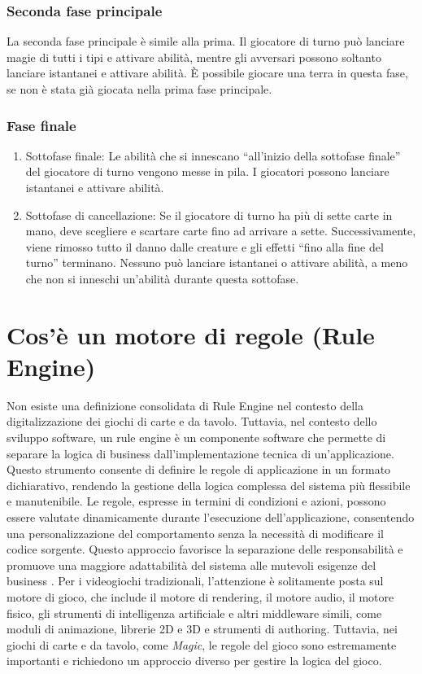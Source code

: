 \subsubsection{Seconda fase principale}
La seconda fase principale è simile alla prima. Il giocatore di turno può lanciare magie di tutti i tipi e attivare abilità, mentre gli avversari possono soltanto lanciare istantanei e attivare abilità. È possibile giocare una terra in questa fase, se non è stata già giocata nella prima fase principale.

\subsubsection{Fase finale}
\begin{enumerate}[label=\alph*.]
    \item Sottofase finale: Le abilità che si innescano “all'inizio della sottofase finale” del giocatore di turno vengono messe in pila. I giocatori possono lanciare istantanei e attivare abilità.
    \item Sottofase di cancellazione: Se il giocatore di turno ha più di sette carte in mano, deve scegliere e scartare carte fino ad arrivare a sette. Successivamente, viene rimosso tutto il danno dalle creature e gli effetti “fino alla fine del turno” terminano. Nessuno può lanciare istantanei o attivare abilità, a meno che non si inneschi un'abilità durante questa sottofase.
\end{enumerate}


\section{Cos'è un motore di regole (Rule Engine)}\label{sec:rule_engine}
Non esiste una definizione consolidata di Rule Engine nel contesto della digitalizzazione dei giochi di carte e da tavolo. Tuttavia, nel contesto dello sviluppo software, un rule engine è un componente software che permette di separare la logica di business dall'implementazione tecnica di un'applicazione. Questo strumento consente di definire le regole di applicazione in un formato dichiarativo, rendendo la gestione della logica complessa del sistema più flessibile e manutenibile. Le regole, espresse in termini di condizioni e azioni, possono essere valutate dinamicamente durante l'esecuzione dell'applicazione, consentendo una personalizzazione del comportamento senza la necessità di modificare il codice sorgente. Questo approccio favorisce la separazione delle responsabilità e promuove una maggiore adattabilità del sistema alle mutevoli esigenze del business \cite{fowler-rule-engine}.
Per i videogiochi tradizionali, l'attenzione è solitamente posta sul motore di gioco, che include il motore di rendering, il motore audio, il motore fisico, gli strumenti di intelligenza artificiale e altri middleware simili, come moduli di animazione, librerie 2D e 3D e strumenti di authoring. Tuttavia, nei giochi di carte e da tavolo, come \emph{Magic}, le regole del gioco sono estremamente importanti e richiedono un approccio diverso per gestire la logica del gioco.\linebreak

